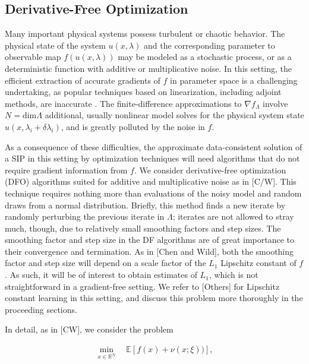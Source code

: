 \documentclass{amsart}
\newcommand{\R}{\mathbb{R}}
\begin{document}
\subsection{Derivative-Free Optimization}

Many important physical systems possess turbulent or chaotic behavior.  The physical state of the system $u(x,\lambda)$ and the corresponding parameter
to observable map $f(u(x,\lambda))$ may be modeled as a stochastic process, or as a deterministic function with additive or multiplicative noise.  
In this setting, the efficient extraction of accurate gradients of $f$ in parameter space is a challenging undertaking, as popular techniques based on
linearization, including adjoint methods, are inaccurate \cite{QiQi}.  The finite-difference approximations to $\nabla f_\Lambda$ 
involve $N=\text{dim}\Lambda$ 
additional, usually nonlinear model solves for the physical system state $u(x,\lambda_i + \delta \lambda_i)$, and is greatly polluted by the noise in $f$.

As a consequence of these difficulties, the approximate data-consistent solution of a SIP in this setting by optimization techniques will need algorithms
that do not require gradient information from $f$.  
We consider derivative-free optimization (DFO) algorithms suited for additive and multiplicative noise as in [C/W]. This technique requires nothing more than evaluations of the noisy model and random draws from a normal distribution. Briefly, this method finds a new iterate by randomly perturbing the previous iterate in $\Lambda$; iterates are not allowed to stray much, though, due to relatively small smoothing factors and step sizes. The smoothing factor and step size in the DF algorithms are of great importance to their convergence and termination. As in [Chen and Wild], both the smoothing factor and step size will depend on a scale factor of the $L_1$ Lipschitz constant of $f$. As such, it will be of interest to obtain estimates of $L_1$, which is not straightforward in a gradient-free setting. We refer to [Others] for Lipschitz constant learning in this setting, and discuss this problem more thoroughly in the proceeding sections.




In detail, as in [CW], we consider the problem

\begin{eqnarray} \label{eq:10}
\min_{x\in\R^N} \quad \mathbb{E}\left[f(x)+\nu (x; \xi))\right],
\end{eqnarray} 
\end{document}
